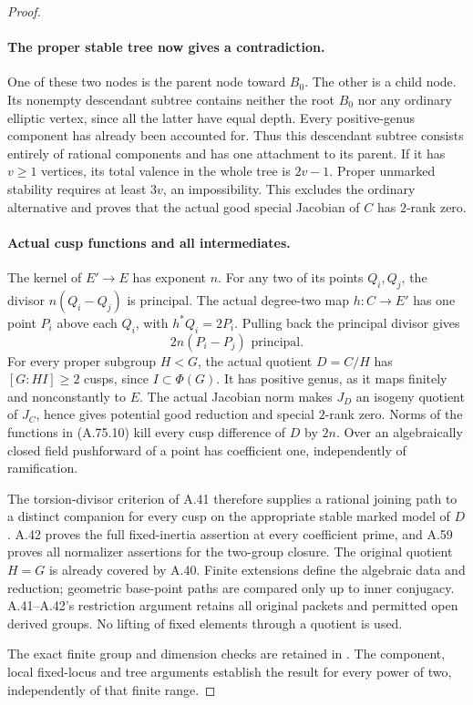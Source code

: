\begin{proof}
\paragraph{The proper stable tree now gives a contradiction.}
One of these two nodes is the parent node toward \(B_0\).
The other is a child node. Its nonempty descendant subtree
contains neither the root \(B_0\) nor any ordinary
elliptic vertex, since all the latter have equal depth.
Every positive-genus component has already been accounted
for. Thus this descendant subtree consists entirely of
rational components and has one attachment to its parent.
If it has \(v\ge1\) vertices, its total valence in the
whole tree is \(2v-1\). Proper unmarked stability requires
at least \(3v\), an impossibility. This excludes the
ordinary alternative and proves that the actual good
special Jacobian of \(C\) has \(2\)-rank zero.

\paragraph{Actual cusp functions and all intermediates.}
The kernel of \(E'\to E\) has exponent \(n\). For
any two of its points \(Q_i,Q_j\), the divisor
\(n(Q_i-Q_j)\) is principal. The actual degree-two map
\(h:C\to E'\) has one point \(P_i\) above each
\(Q_i\), with \(h^*Q_i=2P_i\). Pulling back the
principal divisor gives
\[
                     2n(P_i-P_j)\text{ principal}.
                                                        \tag{A.75.10}
\]
For every proper subgroup \(H<G\), the actual quotient
\(D=C/H\) has \([G:HI]\ge2\) cusps, since
\(I\subset\Phi(G)\). It has positive genus, as it
maps finitely and nonconstantly to \(E\). The actual
Jacobian norm makes \(J_D\) an isogeny quotient of
\(J_C\), hence gives potential good reduction and
special \(2\)-rank zero. Norms of the functions in
(A.75.10) kill every cusp difference of \(D\) by
\(2n\). Over an algebraically closed field pushforward
of a point has coefficient one, independently of ramification.

The torsion-divisor criterion of A.41 therefore supplies
a rational joining path to a distinct companion for every
cusp on the appropriate stable marked model of \(D\).
A.42 proves the full fixed-inertia assertion at every
coefficient prime, and A.59 proves all normalizer assertions
for the two-group closure. The original quotient \(H=G\)
is already covered by A.40. Finite extensions define the
algebraic data and reduction; geometric base-point paths
are compared only up to inner conjugacy. A.41--A.42's
restriction argument retains all original packets and
permitted open derived groups. No lifting of fixed elements
through a quotient is used.

The exact finite group and dimension checks are retained
in . The component,
local fixed-locus and tree arguments establish the result
for every power of two, independently of that finite range.
\end{proof}
